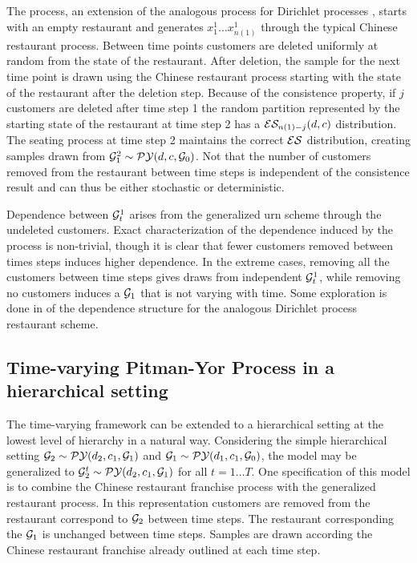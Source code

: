 The process, an extension of the analogous process for Dirichlet processes \cite{caron}, starts with an empty restaurant and generates $x^1_1 \dots x^1_{n(1)}$ through the typical Chinese restaurant process.  Between time points customers are deleted uniformly at random from the state of the restaurant.  After deletion, the sample for the next time point is drawn using the Chinese restaurant process starting with the state of the restaurant after the deletion step.  Because of the consistence property, if $j$ customers are deleted after time step 1 the random partition represented by the starting state of the restaurant at time step 2 has a $\ES_{n(1) - j}(d,c)$ distribution.  The seating process at time step 2 maintains the correct $\ES$ distribution, creating samples drawn from $\G^2_1 \sim \PY(d,c,\G_0)$.  Not that the number of customers removed from the restaurant between time steps is independent of the consistence result and can thus be either stochastic or deterministic.

Dependence between $\G_t^1$ arises from the generalized urn scheme through the undeleted customers.  Exact characterization of the dependence induced by the process is non-trivial, though it is clear that fewer customers removed between times steps induces higher dependence.  In the extreme cases, removing all the customers between time steps gives draws from independent $\G_t^1$, while removing no customers induces a $\G_1$ that is not varying with time. Some exploration is done in \cite{caron} of the dependence structure for the analogous Dirichlet process restaurant scheme.

\subsection{Time-varying Pitman-Yor Process in a hierarchical setting}

The time-varying framework can be extended to a hierarchical setting at the lowest level of hierarchy in a natural way.  Considering the simple hierarchical setting $\G_2 \sim \PY(d_2, c_1, \G_1)$ and $\G_1 \sim \PY(d_1, c_1, \G_0)$, the model may be generalized to $\G^t_2 \sim  \PY(d_2, c_1, \G_1)$ for all $t  = 1 \dots T$.  One specification of this model is to combine the Chinese restaurant franchise process with the generalized restaurant process.  In this representation customers are removed from the restaurant correspond to $\G_2$ between time steps.  The restaurant corresponding the $\G_1$ is unchanged between time steps. Samples are drawn according the Chinese restaurant franchise already outlined at each time step.

